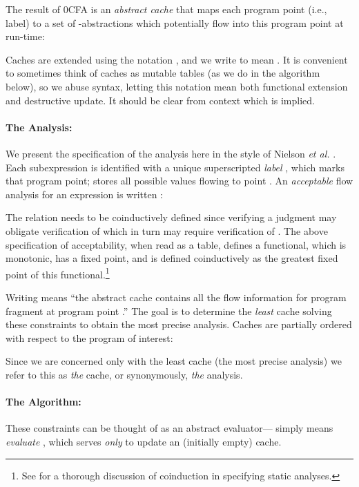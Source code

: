 \documentclass{llncs}
\begin{document}
The result of 0CFA is an {\em abstract cache} that maps each program
point (i.e., label) to a set of -abstractions which
potentially flow into this program point at run-time:

Caches are extended using the notation , and
we write  to mean .  It is convenient to sometimes think of caches
as mutable tables (as we do in the algorithm below), so we abuse
syntax, letting this notation mean both functional extension and
destructive update.  It should be clear from context which is implied.

\paragraph{The Analysis:} We present the specification of the analysis here in the style of
Nielson {\em et al.} \cite{nielson-nielson-hankin}.  Each
subexpression is identified with a unique superscripted {\em label}
, which marks that program point;  stores all
possible values flowing to point .  An {\em acceptable} flow
analysis for an expression  is written :

The  relation needs to be coinductively defined since
verifying a judgment  may obligate verification of
 which in turn may require verification of .  The above specification of acceptability, when read as a
table, defines a functional, which is monotonic,
has a fixed point, and  is defined coinductively as the
greatest fixed point of this functional.\footnote{See
\cite{nielson-nielson-hankin} for a thorough discussion of coinduction
in specifying static analyses.}

Writing  means ``the abstract cache 
contains all the flow information for program fragment  at program
point .''  The goal is to determine the {\em least} cache
solving these constraints to obtain the most precise analysis. Caches
are partially ordered with respect to the program of interest:

Since we are concerned only with the least cache (the most precise
analysis) we refer to this as {\em the} cache, or synonymously, {\em
the} analysis.

\paragraph{The Algorithm:}

These constraints can be thought of as an abstract evaluator---
 simply means {\em evaluate} , which
serves {\em only} to update an (initially empty) cache.
\end{document}
